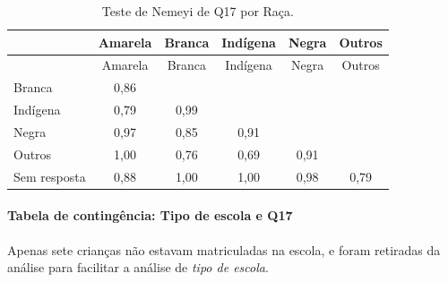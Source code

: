 \documentclass[]{article}
\let\oldparagraph\paragraph
\renewcommand{\paragraph}[1]{\oldparagraph{#1}\mbox{}}
\begin{document}
\begin{longtable}[]{@{}lccccc@{}}
\caption{\label{tab:unnamed-chunk-208}Teste de Nemeyi de Q17 por Raça.}\tabularnewline
\toprule
& Amarela & Branca & Indígena & Negra & Outros\tabularnewline
\midrule
\endfirsthead
\toprule
& Amarela & Branca & Indígena & Negra & Outros\tabularnewline
\midrule
\endhead
Branca & 0,86 & & & &\tabularnewline
Indígena & 0,79 & 0,99 & & &\tabularnewline
Negra & 0,97 & 0,85 & 0,91 & &\tabularnewline
Outros & 1,00 & 0,76 & 0,69 & 0,91 &\tabularnewline
Sem resposta & 0,88 & 1,00 & 1,00 & 0,98 & 0,79\tabularnewline
\bottomrule
\end{longtable}

\cleardoublepage

\hypertarget{tabela-de-continguxeancia-tipo-de-escola-e-q17}{%
\paragraph{Tabela de contingência: Tipo de escola e Q17}\label{tabela-de-continguxeancia-tipo-de-escola-e-q17}}

Apenas sete crianças não estavam matriculadas na escola, e foram retiradas da análise para facilitar a análise de \emph{tipo de escola}.
\end{document}
